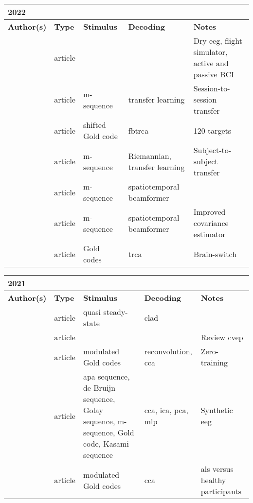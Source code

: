 \documentclass[a4paper,landscape]{article}
\begin{document}
\begin{table}[H]
	\begin{tabular}{p{5cm}p{2cm}p{5cm}p{5cm}p{6.5cm}}
		\textbf{2022} & & & & \\
		\toprule
		\textbf{Author(s)} & \textbf{Type} & \textbf{Stimulus} & \textbf{Decoding} & \textbf{Notes} \\
		\midrule
		\citeauthor{dehais2022} & article & & & Dry \acrshort{eeg}, flight simulator, active and passive BCI \\
		\citeauthor{stawicki2022} & article & m-sequence & transfer learning & Session-to-session transfer \\
		\citeauthor{sun2022} & article & shifted Gold code & \acrshort{fbtrca} & 120 targets \\
		\citeauthor{ying2022} & article & m-sequence & Riemannian, transfer learning & Subject-to-subject transfer \\
		\citeauthor{zarei2022a} & article & m-sequence & spatiotemporal beamformer & \\
		\citeauthor{zarei2022b} & article & m-sequence & spatiotemporal beamformer & Improved covariance estimator \\
		\citeauthor{zheng2022} & article & Gold codes & \acrshort{trca} & Brain-switch \\
		\bottomrule
	\end{tabular}
\end{table}

\begin{table}[H]
	\begin{tabular}{p{5cm}p{2cm}p{5cm}p{5cm}p{6.5cm}}
		\textbf{2021} & & & & \\
		\toprule
		\textbf{Author(s)} & \textbf{Type} & \textbf{Stimulus} & \textbf{Decoding} & \textbf{Notes} \\
		\midrule
		\citeauthor{kaya2021} & article & quasi steady-state & \acrshort{clad} & \\
		\citeauthor{martinezcagigal2021} & article & & & Review \acrshort{cvep} \\
		\citeauthor{thielen2021} & article & modulated Gold codes & reconvolution, \acrshort{cca} & Zero-training \\
		\citeauthor{torres2021} & article & \acrshort{apa} sequence, de Bruijn sequence, Golay sequence, m-sequence, Gold code, Kasami sequence & \acrshort{cca}, \acrshort{ica}, \acrshort{pca}, \acrshort{mlp}  & Synthetic \acrshort{eeg} \\
		\citeauthor{verbaarschot2021} & article & modulated Gold codes & \acrshort{cca} & \acrshort{als} versus healthy participants \\
		\bottomrule
	\end{tabular}
\end{table}
\end{document}

